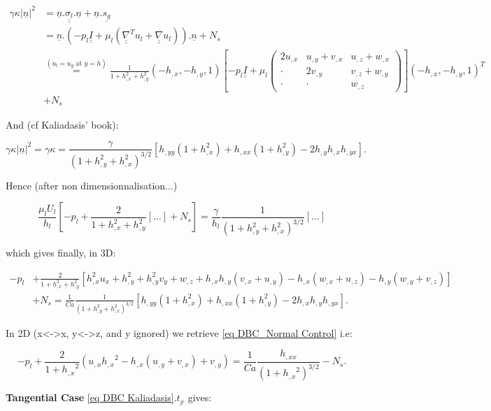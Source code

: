 \documentclass[12pt]{article}
\begin{document}
\begin{align*}
\gamma \kappa |\underline{n}|^2&= \underline{n}.\underline{\underline{\sigma_l}}.\underline{n} + \underline{n}.\underline{s_g} \\
 &= \underline{n}.\left( -p_l \underline{\underline{I}} + \mu_l(\underline{\underline{\nabla}}^Tu_l+\underline{\underline{\nabla}}u_l)\right).\underline{n}+N_s\\
 &\overset{(u_l=u_g \text{ at } y=h)}{=} \frac{1}{1+h_{,x}^2+h_{,y}^2}(-h_{,x}, -h_{,y}, 1)\left[ -p_l\underline{\underline{I}} + \mu_l\begin{pmatrix}
2u_{,x} & u_{,y}+v_{,x} & u_{,z}+w_{,x} \\
\cdot & 2v_{,y} & v_{,z}+w_{,y} \\
\cdot & \cdot & w_{,z}
\end{pmatrix} \right](-h_{,x}, -h_{,y}, 1)^T\\ 
&+N_s
\end{align*}

And (cf Kaliadasis' book): 

$$\gamma \kappa |\underline{n}|^2 = \gamma \kappa = \frac{\gamma}{(1+h_{,y}^2+h_{,x}^2)^{3/2}}\left[ h_{,yy}(1+h_{,x}^2)+h_{,xx}(1+h_{,y}^2)-2h_{,y}h_{,x}h_{,yx}\right].$$

Hence (after non dimensionnalisation...)

$$\frac{\mu_lU_l}{h_l}\left[-p_l+\frac{2}{1+h_{,x}^2+h_{,y}^2}[\dots]+N_s\right]=\frac{\gamma}{h_l}\frac{1}{(1+h_{,y}^2+h_{,x}^2)^{3/2}}[\dots]$$

which gives finally, in 3D:

\begin{equation}
\begin{aligned}
-p_l &+\frac{2}{1+h_{,x}^2+h_{,y}^2}[h_{,x}^2u_x+h_{,y}^2+h_{,y}^2v_y+w_{,z}+h_{,x}h_{,y}(v_{,x}+u_{,y})-h_{,x}(w_{,x}+u_{,z})-h_{,y}(w_{,y}+v_{,z})]\\
&+N_s =\frac{1}{Ca}\frac{1}{(1+h_{,y}^2+h_{,x}^2)^{3/2}}[h_{,yy}(1+h_{,x}^2)+h_{,xx}(1+h_{,y}^2)-2h_{,x}h_{,y}h_{,yx}].
\end{aligned}
\end{equation}

In 2D (x<->x, y<->z, and y ignored) we retrieve \ref{eq DBC_Normal Control} i.e:

$$-p_l + \frac{2}{1+{h_{,x}}^2}(u_{,x}{h_{,x}}^2 - h_{,x}(u_{,y} + v_{,x})+v_{,y}) = \frac{1}{Ca} \frac{h_{,xx}}{(1+{h_{,x}}^2)^{3/2}}-N_s.
$$


\textbf{Tangential Case}
\ref{eq DBC Kaliadasis}.$\underline{t_x}$ gives: 
\end{document}
